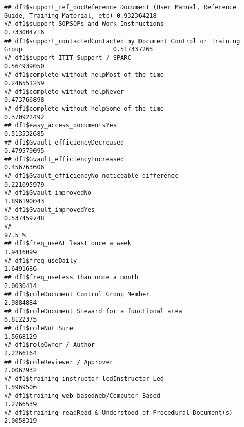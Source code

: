 \documentclass[]{article}
\begin{document}
\begin{verbatim}
## df1$support_ref_docReference Document (User Manual, Reference Guide, Training Material, etc) 0.932364218
## df1$support_SOPSOPs and Work Instructions                                                    0.733004716
## df1$support_contactedContacted my Document Control or Training Group                         0.517337265
## df1$support_ITIT Support / SPARC                                                             0.564939050
## df1$complete_without_helpMost of the time                                                    0.246551259
## df1$complete_without_helpNever                                                               0.473766898
## df1$complete_without_helpSome of the time                                                    0.370922492
## df1$easy_access_documentsYes                                                                 0.513532685
## df1$Gvault_efficiencyDecreased                                                               0.479579095
## df1$Gvault_efficiencyIncreased                                                               0.456763606
## df1$Gvault_efficiencyNo noticeable difference                                                0.221095979
## df1$Gvault_improvedNo                                                                        1.896190043
## df1$Gvault_improvedYes                                                                       0.537459748
##                                                                                                   97.5 %
## df1$freq_useAt least once a week                                                               1.9416099
## df1$freq_useDaily                                                                              1.6491686
## df1$freq_useLess than once a month                                                             2.0030414
## df1$roleDocument Control Group Member                                                          2.9884884
## df1$roleDocument Steward for a functional area                                                 6.8122375
## df1$roleNot Sure                                                                               1.5668129
## df1$roleOwner / Author                                                                         2.2266164
## df1$roleReviewer / Approver                                                                    2.0062932
## df1$training_instructor_ledInstructor Led                                                      1.5969506
## df1$training_web_basedWeb/Computer Based                                                       1.2766539
## df1$training_readRead & Understood of Procedural Document(s)                                   2.0058319

\end{verbatim}
\end{document}
